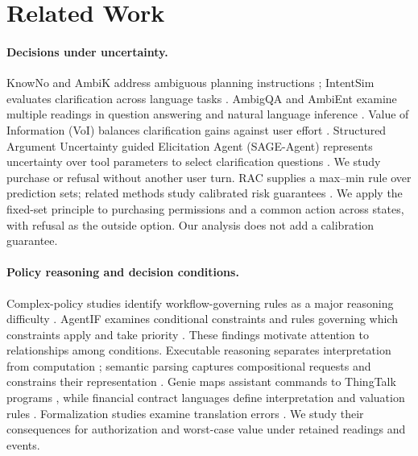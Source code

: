 \section{Related Work}
\label{sec:related}
\paragraph{Decisions under uncertainty.}
KnowNo and AmbiK address ambiguous planning instructions \citep{knowno,ambik}; IntentSim evaluates clarification across language tasks \citep{intentsim}. AmbigQA and AmbiEnt examine multiple readings in question answering and natural language inference \citep{min2020ambigqa,liu2023ambiguity}. Value of Information (VoI) balances clarification gains against user effort \citep{voi}. Structured Argument Uncertainty guided Elicitation Agent (SAGE-Agent) represents uncertainty over tool parameters to select clarification questions \citep{sage}. We study purchase or refusal without another user turn. RAC supplies a max--min rule over prediction sets; related methods study calibrated risk guarantees \citep{rac,crc,actionrac}. We apply the fixed-set principle to purchasing permissions and a common action across states, with refusal as the outside option. Our analysis does not add a calibration guarantee.

\paragraph{Policy reasoning and decision conditions.}
Complex-policy studies identify workflow-governing rules as a major reasoning difficulty \citep{complexpolicy}. AgentIF examines conditional constraints and rules governing which constraints apply and take priority \citep{agentif}. These findings motivate attention to relationships among conditions. Executable reasoning separates interpretation from computation \citep{pal,logiclm,linc}; semantic parsing captures compositional requests and constrains their representation \citep{gupta2018hierarchical,shin2021constrained}. Genie maps assistant commands to ThingTalk programs \citep{campagna2019genie}, while financial contract languages define interpretation and valuation rules \citep{composingcontracts}. Formalization studies examine translation errors \citep{folcode,fover,verify}. We study their consequences for authorization and worst-case value under retained readings and events.


